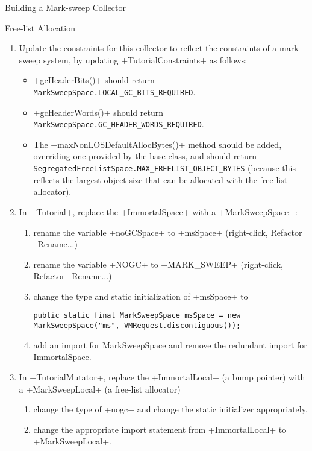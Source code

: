 \begin{chapter}{Building a Mark-sweep Collector}
\begin{section}{Free-list Allocation}
\begin{enumerate}
  \item Update the constraints for this collector to reflect the constraints of a mark-sweep system, by updating \spverb+TutorialConstraints+ as follows:
    \begin{itemize}
      \item \spverb+gcHeaderBits()+ should return \texttt{Mark\-Sweep\-Space.LOCAL\_GC\_BITS\_REQUIRED}.
      \item \spverb+gcHeaderWords()+ should return \texttt{Mark\-Sweep\-Space.GC\_HEADER\_WORDS\_REQUIRED}.
      \item The \spverb+maxNonLOSDefaultAllocBytes()\spverb+ method should be added, overriding one provided by the base class, and should return \texttt{Se\-gre\-ga\-ted\-Free\-List\-Spa\-ce.MAX\_FREELIST\_OBJECT\_BYTES} (because this reflects the largest object size that can be allocated with the free list allocator).
    \end{itemize}
  \item In \spverb+Tutorial+, replace the \spverb+ImmortalSpace+ with a \spverb+MarkSweepSpace+:
    \begin{enumerate}
      \item rename the variable \spverb+noGCSpace+ to \spverb+msSpace+ (right-click, Refactor \textrightarrow\ Rename...)
      \item rename the variable \spverb+NOGC+ to \spverb+MARK_SWEEP+ (right-click, Refactor \textrightarrow\ Rename...)
      \item change the type and static initialization of \spverb+msSpace+ to
        \begin{lstlisting}
public static final MarkSweepSpace msSpace = new MarkSweepSpace("ms", VMRequest.discontiguous());
        \end{lstlisting}
      \item add an import for MarkSweepSpace and remove the redundant import for ImmortalSpace.
    \end{enumerate}
  \item In \spverb+TutorialMutator+, replace the \spverb+ImmortalLocal+ (a bump pointer) with a \spverb+MarkSweepLocal+ (a free-list allocator)
    \begin{enumerate}
      \item change the type of \spverb+nogc+ and change the static initializer appropriately.
      \item change the appropriate import statement from \spverb+ImmortalLocal+ to \spverb+MarkSweepLocal+.

\end{enumerate}
\end{enumerate}
\end{section}
\end{chapter}
